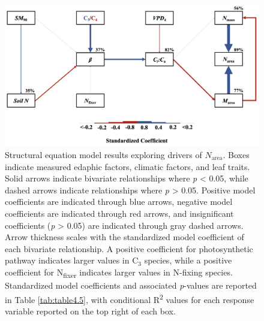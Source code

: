 \newpage
\begin{landscape}
    \begin{figure}
        \centering
        \includegraphics[scale = 0.35]{ch4_TXeco/figs/TXeco_fig5_SEM.png}
        \caption[Structural equation model results exploring drivers of $N_\mathrm{area}$]{Structural equation model results exploring drivers of $N_\mathrm{area}$. Boxes indicate measured edaphic factors, climatic factors, and leaf traits. Solid arrows indicate bivariate relationships where \textit{p} < 0.05, while dashed arrows indicate relationships where \textit{p} > 0.05. Positive model coefficients are indicated through blue arrows, negative model coefficients are indicated through red arrows, and insignificant coefficients (\textit{p} > 0.05) are indicated through gray dashed arrows. Arrow thickness scales with the standardized model coefficient of each bivariate relationship. A positive coefficient for photosynthetic pathway indicates larger values in C$_3$ species, while a positive coefficient for N\textsubscript{fixer} indicates larger values in N-fixing species. Standardized model coefficients and associated \textit{p}-values are reported in Table \ref{tab:table4.5}, with conditional R\textsuperscript{2} values for each response variable reported on the top right of each box.}
        \label{fig:figure4.5}
    \end{figure}
\end{landscape}
\clearpage

